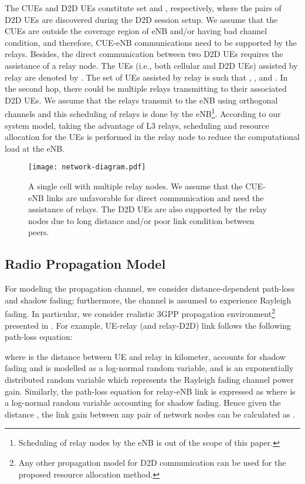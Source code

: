 \documentclass[twocolumn,10pt]{IEEEtran}
\begin{document}
The CUEs and D2D UEs constitute set  and , respectively, where the pairs of D2D UEs are discovered during the D2D session setup. We assume that the CUEs are outside the coverage region of eNB and/or having bad channel condition, and therefore, CUE-eNB communications need to be supported by the relays. Besides, the direct communication between two D2D UEs  requires the assistance of a relay node. The UEs (i.e., both cellular and D2D UEs) assisted by relay  are denoted by . The set of UEs assisted by relay  is  such that , , and  .  In the second hop, there could be multiple relays transmitting to their associated D2D UEs. We assume that the relays transmit to the eNB using orthogonal channels and this scheduling of relays is done by the eNB\footnote{Scheduling of relay nodes by the eNB is out of the scope of this paper.}. According to our system model, taking the advantage of L3 relays, scheduling and resource allocation for the UEs is performed in the relay node to reduce the computational load at the eNB. 
 

\begin{figure}[!t]
\centering
\texttt{[image: network-diagram.pdf]}
\caption{A single cell with multiple relay nodes. We assume that the CUE-eNB links are unfavorable for direct communication and need the assistance of relays. The D2D UEs are also supported by the relay nodes due to long distance and/or poor link condition between peers. 
} 
\label{fig:nw_diagram}
\end{figure}

\subsection{Radio Propagation Model}

For modeling the  propagation channel, we consider distance-dependent path-loss and shadow fading; furthermore, the channel is assumed to  experience Rayleigh fading. In particular, we consider realistic 3GPP propagation environment\footnote{Any other propagation model for D2D communication can be used for the proposed resource allocation method.} presented in \cite{relay-book-2}. For example, UE-relay (and relay-D2D) link follows the following path-loss equation: 

where  is the distance between UE and relay in kilometer,  accounts for shadow fading and is modelled as a log-normal random variable, and  is an exponentially distributed random variable which represents the Rayleigh fading channel power gain. Similarly, the path-loss equation for relay-eNB link is expressed as  
where  is a log-normal random variable accounting for shadow fading. Hence given the distance , the link gain between any pair of network nodes  can be calculated as .
\end{document}
